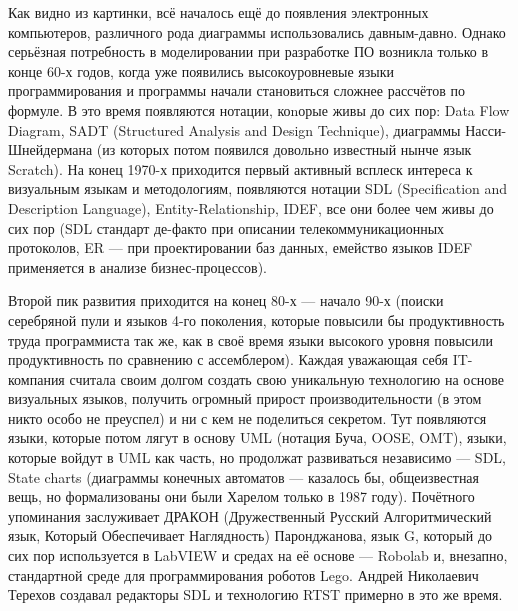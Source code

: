 \documentclass[a5paper]{article}
\begin{document}
Как видно из картинки, всё началось ещё до появления электронных компьютеров, различного рода диаграммы использовались давным-давно. Однако серьёзная потребность в моделировании при разработке ПО возникла только в конце 60-х годов, когда уже появились высокоуровневые языки программирования и программы начали становиться сложнее рассчётов по формуле. В это время появляются нотации, коnорые живы до сих пор: Data Flow Diagram, SADT (Structured Analysis and Design Technique), диаграммы Насси-Шнейдермана (из которых потом появился довольно известный нынче язык Scratch). На конец 1970-х приходится первый активный всплеск интереса к визуальным языкам и методологиям, появляются нотации SDL (Specification and Description Language), Entity-Relationship, IDEF, все они более чем живы до сих пор (SDL стандарт де-факто при описании телекоммуникационных протоколов, ER --- при проектировании баз данных, емейство языков IDEF применяется в анализе бизнес-процессов). 

Второй пик развития приходится на конец 80-х --- начало 90-х (поиски серебряной пули и языков 4-го поколения, которые повысили бы продуктивность труда программиста так же, как в своё время языки высокого уровня повысили продуктивность по сравнению с ассемблером). Каждая уважающая себя IT-компания считала своим долгом создать свою уникальную технологию на основе визуальных языков, получить огромный прирост производительности (в этом никто особо не преуспел) и ни с кем не поделиться секретом. Тут появляются языки, которые потом лягут в основу UML (нотация Буча, OOSE, OMT), языки, которые войдут в UML как часть, но продолжат развиваться независимо --- SDL, State charts (диаграммы конечных автоматов --- казалось бы, общеизвестная вещь, но формализованы они были Харелом только в 1987 году). Почётного упоминания заслуживает ДРАКОН (Дружественный Русский Алгоритмический язык, Который Обеспечивает Наглядность) Паронджанова, язык G, который до сих пор используется в LabVIEW и средах на её основе --- Robolab и, внезапно, стандартной среде для программирования роботов Lego. Андрей Николаевич Терехов создавал редакторы SDL и технологию RTST примерно в это же время.
\end{document}
